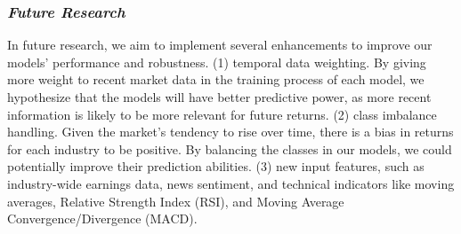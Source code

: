\documentclass{article}
\begin{document}
\subsubsection{\emph{Future Research}}


In future research, we aim to implement several enhancements to improve our models' performance and robustness. (1) temporal data weighting. By giving more weight to recent market data in the training process of each model, we hypothesize that the models will have better predictive power, as more recent information is likely to be more relevant for future returns. (2) class imbalance handling. Given the market's tendency to rise over time, there is a bias in returns for each industry to be positive. By balancing the classes in our models, we could potentially improve their prediction abilities. (3) new input features, such as industry-wide earnings data, news sentiment, and technical indicators like moving averages, Relative Strength Index (RSI), and Moving Average Convergence/Divergence (MACD). 
\end{document}
